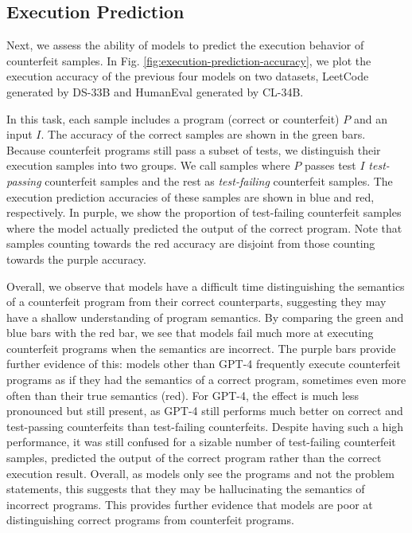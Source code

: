 \subsection{Execution Prediction}
Next, we assess the ability of models to predict the execution behavior of counterfeit samples. In Fig. \ref{fig:execution-prediction-accuracy}, we plot the execution accuracy of the previous four models on two datasets, LeetCode generated by DS-33B and HumanEval generated by CL-34B. 

In this task, each sample includes a program (correct or counterfeit) $P$ and an input $I$. The accuracy of the correct samples are shown in the green bars. Because counterfeit programs still pass a subset of tests, we distinguish their execution samples into two groups. We call samples where $P$ passes test $I$ \textit{test-passing} counterfeit samples and the rest as \textit{test-failing} counterfeit samples. The execution prediction accuracies of these samples are shown in blue and red, respectively. In purple, we show the proportion of test-failing counterfeit samples where the model actually predicted the output of the correct program. Note that samples counting towards the red accuracy are disjoint from those counting towards the purple accuracy.

Overall, we observe that models have a difficult time distinguishing the semantics of a counterfeit program from their correct counterparts, suggesting they may have a shallow understanding of program semantics. By comparing the green and blue bars with the red bar, we see that models fail much more  at executing counterfeit programs when the semantics are incorrect. The purple bars provide further evidence of this: models other than GPT-4 frequently execute counterfeit programs as if they had the semantics of a correct program, sometimes even more often than their true semantics (red). For GPT-4, the effect is much less pronounced but still present, as GPT-4 still performs much better on correct and test-passing counterfeits than test-failing counterfeits. Despite having such a high performance, it was still confused for a sizable number of test-failing counterfeit samples, predicted the output of the correct program rather than the correct execution result. Overall, as models only see the programs and not the problem statements, this suggests that they may be hallucinating the semantics of incorrect programs. This provides further evidence that models are poor at distinguishing correct programs from counterfeit programs.

